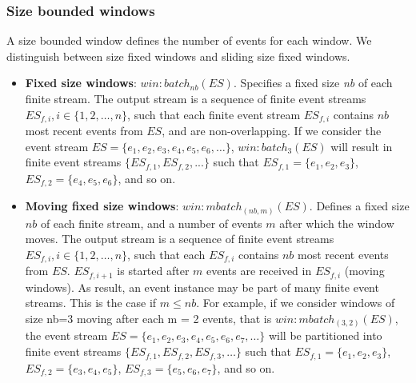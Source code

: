 \subsubsection{Size bounded windows}
A size bounded window defines the number of events for each window. We distinguish between size fixed windows and sliding size fixed windows.
\begin{itemize}
 \item \textbf{Fixed size windows}: $win:batch_{nb}(ES)$. Specifies a fixed size \textit{nb} of each finite stream. The output stream is a sequence of finite event streams $ES_{f,i}, i \in \{1, 2, …, n\}$, such that each finite event stream $ES_{f,i}$ contains $nb$ most recent events from $ES$, and are non-overlapping. If we consider the event stream $ES = \{e_1, e_2, e_3, e_4, e_5, e_6, …\}$, $win:batch_3(ES)$ will result in finite event streams $\{ES_{f,1}, ES_{f,2},...\}$ such that $ES_{f,1} = \{ e_1, e_2, e_3\}$, $ES_{f,2} = \{ e_4, e_5, e_6\}$, and so on. 

 \item \textbf{Moving fixed size windows}: $win:mbatch_{(nb, m)}(ES)$. Defines a fixed size $nb$ of each finite stream, and a number of events $m$ after which the window moves. The output stream is a sequence of finite event streams $ES_{f,i}, i \in \{1, 2, …, n\}$, such that each $ES_{f,i}$ contains $nb$ most recent events from $ES$. $ES_{f,i+1}$ is started after $m$ events are received in $ES_{f,i}$ (moving windows). As result, an event instance may be part of many finite event streams. This is the case if $m \leq nb$. For example, if we consider windows of size nb=3 moving after each m = 2 events, that is $win:mbatch_{(3, 2)}(ES)$, the event stream $ES = \{ e_1, e_2, e_3, e_4, e_5, e_6, e_7, …\}$ will be partitioned into finite event streams $\{ES_{f,1}, ES_{f,2}, ES_{f,3} , …\}$ such that $ES_{f,1}=\{e_1, e_2, e_3\}$, $ES_{f,2} = \{ e_3, e_4, e_5\}$, $ES_{f,3} = \{e_5, e_6, e_7\}$, and so on.
\end{itemize}

